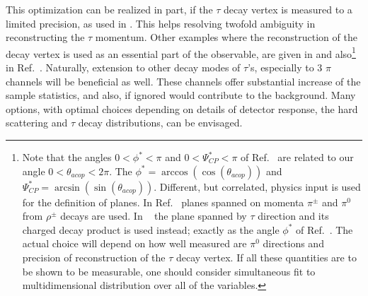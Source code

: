 \documentclass[12pt]{article}
\begin{document}
This optimization can be realized in part,
if the  $\tau$ decay vertex is  measured to a limited precision, as 
used in  \cite{Desch:2003mw}.  This helps resolving twofold ambiguity in reconstructing the $\tau$ momentum.
Other examples where the reconstruction of the decay vertex is used
as an essential part of the observable, are given in  
\cite{Rouge:2005iy} and  also\footnote{
Note that the angles $0<\phi^*< \pi $ and $0<\Psi_{CP}^* < \pi$ of Ref.~\cite{Berge:2008dr} 
are  related to  our angle $0<\theta_{acop} < 2 \pi$. The  $\phi^*=\arccos(\cos (\theta_{acop}) )$ and 
$\Psi_{CP}^*=\arcsin (\sin (\theta_{acop}) )$. Different, but correlated, physics input is used for the definition of planes.
In Ref.~\cite{Desch:2003rw} planes spanned on momenta  $\pi^\pm$ and $\pi^0$  from $\rho^\pm$ decays are used.  
In ~\cite{Berge:2008dr} the plane spanned by $\tau$ direction and its charged decay product is used 
instead; exactly as the angle $\phi^*$ of Ref.~\cite{Kramer:1994jn}. 
The actual choice will depend on how well measured are $\pi^0$ directions and precision of reconstruction
of the $\tau$ decay vertex. If all these quantities are to be shown to be measurable, one should 
consider simultaneous fit to multidimensional distribution over  all of the variables.} in
 Ref.~\cite{Berge:2008dr}. Naturally, extension to other decay modes of $\tau$'s, 
especially to 3 $\pi$ channels will be beneficial as well. These channels offer
substantial increase of the sample statistics, and also, if ignored would contribute 
to the background. Many options, with optimal choices depending  on 
details of detector 
response, the hard scattering  and $\tau$ decay distributions, can be envisaged.
\end{document}
